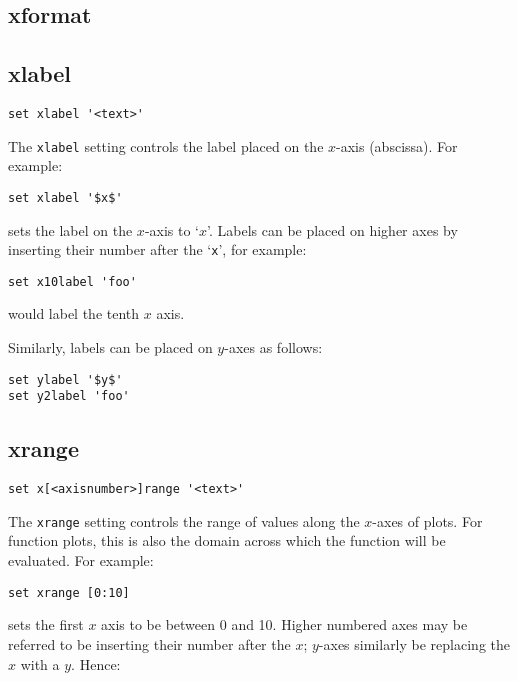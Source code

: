 \subsection{xformat}


\subsection{xlabel}

\begin{verbatim}
set xlabel '<text>'
\end{verbatim}

The {\tt xlabel} setting controls the label placed on the $x$-axis (abscissa).
For example:

\begin{verbatim}
set xlabel '$x$'
\end{verbatim}

\noindent sets the label on the $x$-axis to `$x$'.  Labels can be placed on higher axes by
inserting their number after the `{\tt x}', for example:

\begin{verbatim}
set x10label 'foo'
\end{verbatim}

\noindent would label the tenth $x$ axis.

Similarly, labels can be placed on $y$-axes as follows:

\begin{verbatim}
set ylabel '$y$'
set y2label 'foo'
\end{verbatim}


\subsection{xrange}

\begin{verbatim}
set x[<axisnumber>]range '<text>'
\end{verbatim}

The {\tt xrange} setting controls the range of values along the $x$-axes of
plots.  For function plots, this is also the domain across which the function
will be evaluated.  For example:

\begin{verbatim}
set xrange [0:10]
\end{verbatim}

\noindent sets the first $x$ axis to be between 0 and 10.  Higher numbered axes may be
referred to be inserting their number after the $x$; $y$-axes similarly be
replacing the $x$ with a $y$.  Hence:

